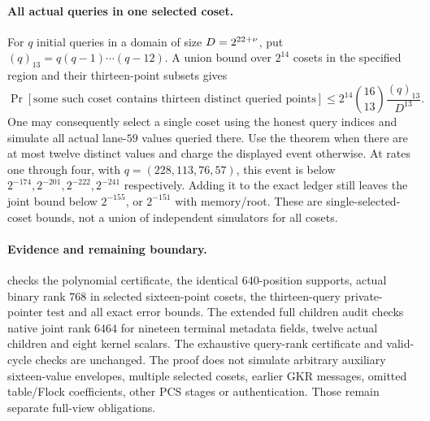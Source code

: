\paragraph{All actual queries in one selected coset.} For $q$ initial queries in a domain of size $D=2^{22+\nu}$, put $(q)_{13}=q(q-1)\cdots(q-12)$. A union bound over $2^{14}$ cosets in the specified region and their thirteen-point subsets gives
\[
 \Pr[\text{some such coset contains thirteen distinct queried points}]
 \le 2^{14}\binom{16}{13}\frac{(q)_{13}}{D^{13}}.
\]
One may consequently select a single coset using the honest query indices and simulate all actual lane-$59$ values queried there. Use the theorem when there are at most twelve distinct values and charge the displayed event otherwise. At rates one through four, with $q=(228,113,76,57)$, this event is below $2^{-174},2^{-201},2^{-222},2^{-241}$ respectively. Adding it to the exact ledger still leaves the joint bound below $2^{-155}$, or $2^{-151}$ with memory/root. These are single-selected-coset bounds, not a union of independent simulators for all cosets.

\paragraph{Evidence and remaining boundary.}  checks the polynomial certificate, the identical $640$-position supports, actual binary rank $768$ in selected sixteen-point cosets, the thirteen-query private-pointer test and all exact error bounds. The extended full children audit checks native joint rank $6464$ for nineteen terminal metadata fields, twelve actual children and eight kernel scalars. The exhaustive query-rank certificate and valid-cycle checks are unchanged. The proof does not simulate arbitrary auxiliary sixteen-value envelopes, multiple selected cosets, earlier GKR messages, omitted table/Flock coefficients, other PCS stages or authentication. Those remain separate full-view obligations.
